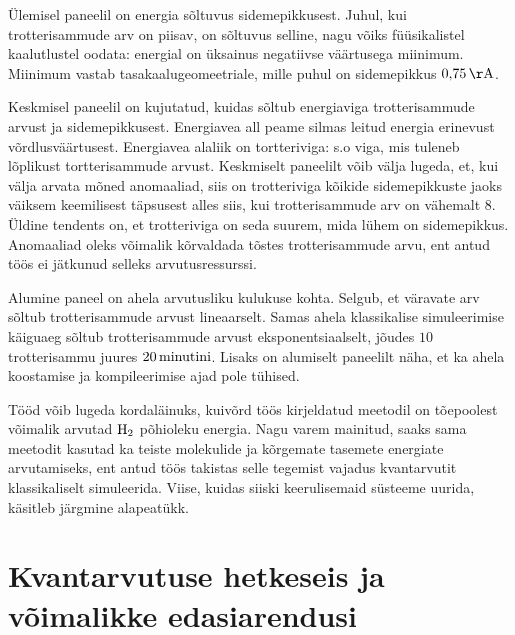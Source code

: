 \documentclass[12pt]{report}
\begin{document}
Ülemisel paneelil on energia sõltuvus sidemepikkusest.
Juhul, kui trotterisammude arv on piisav, on sõltuvus selline, nagu võiks füüsikalistel kaalutlustel oodata: energial on üksainus negatiivse väärtusega miinimum.
Miinimum vastab tasakaalugeomeetriale, mille puhul on sidemepikkus \(0{,}75\,{\rm Å}\).

Keskmisel paneelil on kujutatud, kuidas sõltub energiaviga trotterisammude arvust ja sidemepikkusest.
Energiavea all peame silmas leitud energia erinevust võrdlusväärtusest.
Energiavea alaliik on tortteriviga: s.o viga, mis tuleneb lõplikust tortterisammude arvust.
Keskmiselt paneelilt võib välja lugeda, et, kui välja arvata mõned anomaaliad, siis on trotteriviga kõikide sidemepikkuste jaoks väiksem keemilisest täpsusest alles siis, kui trotterisammude arv on vähemalt \(8\).
Üldine tendents on, et trotteriviga on seda suurem, mida lühem on sidemepikkus.
Anomaaliad oleks võimalik kõrvaldada tõstes trotterisammude arvu, ent antud töös ei jätkunud selleks arvutusressurssi.

Alumine paneel on ahela arvutusliku kulukuse kohta.
Selgub, et väravate arv sõltub trotterisammude arvust lineaarselt.
Samas ahela klassikalise simuleerimise käiguaeg sõltub trotterisammude arvust eksponentsiaalselt, jõudes \(10\) trotterisammu juures \(20\,{\rm minutini}\).
Lisaks on alumiselt paneelilt näha, et ka ahela koostamise ja kompileerimise ajad pole tühised.

Tööd võib lugeda kordaläinuks, kuivõrd töös kirjeldatud meetodil on tõepoolest võimalik arvutad \(\rm H_2\) põhioleku energia.
Nagu varem mainitud, saaks sama meetodit kasutad ka teiste molekulide ja kõrgemate tasemete energiate arvutamiseks, ent antud töös takistas selle tegemist vajadus kvantarvutit klassikaliselt simuleerida.
Viise, kuidas siiski keerulisemaid süsteeme uurida, käsitleb järgmine alapeatükk.

\section{Kvantarvutuse hetkeseis ja võimalikke edasiarendusi}
\end{document}

